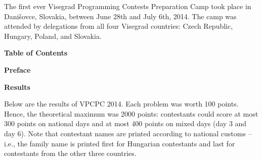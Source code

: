 \documentclass[oneside,a4paper]{book}
\begin{document}
The first ever Visegrad Programming Contests Preparation Camp took place in Danišovce, Slovakia,
between June 28th and July 6th, 2014. The camp was attended by delegations from all four Visegrad
countries: Czech Republic, Hungary, Poland, and Slovakia.
\newpage

\noindent\centerline{\sf\Large\bfseries Table of Contents}
\makeatletter\let\l@section\l@chapter\let\l@chapter\l@part{}\makeatother
\newpage

\noindent\centerline{\sf\large\bfseries Preface}
\newpage

\noindent\centerline{\sf\large\bfseries Results}
\bigskip

Below are the results of VPCPC 2014. Each problem was worth 100 points. 
Hence, the theoretical maximum was 2000 points: contestants could 
score at most 300 points on national days and at most 400 points
on mixed days (day 3 and day 6). Note that contestant names are
printed according to national customs -- i.e., the family name is
printed first for Hungarian contestants and last for contestants from
the other three countries.
\bigskip
\bigskip

\newpage

\newpage
{}\newpage
{}\newpage

{}
\newpage
{}\newpage
{}\newpage

\newpage
{}\newpage
{}\newpage
{}\newpage

\newpage
{}\newpage
{}\newpage
\end{document}
